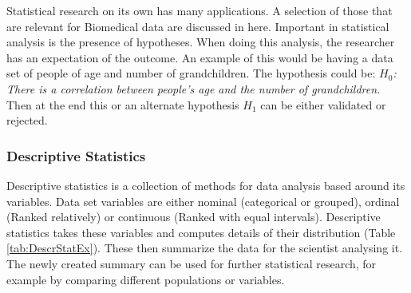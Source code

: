 \documentclass[10pt,a4paper]{article}
\begin{document}
	Statistical research on its own has many applications. A selection of those 
	that are relevant for Biomedical data are discussed in here. Important in 
	statistical analysis is the presence of hypotheses. When doing this 
	analysis, the researcher has an expectation of the outcome. An example of 
	this would be having a data set of people of age and number of 
	grandchildren. The hypothesis could be: \textit{$H_0$: There is a 
	correlation between people's age and the number of grandchildren.} Then at 
	the end this or an alternate hypothesis $H_1$ can be either validated or 
	rejected.\cite{heiberger2004statistical}
	
	\subsubsection{Descriptive Statistics}
	
	Descriptive statistics is a collection of methods for data analysis based around its variables. Data set variables are either nominal (categorical or grouped), ordinal (Ranked relatively) or continuous (Ranked with equal intervals). Descriptive statistics takes these variables and computes details of their distribution (Table \ref{tab:DescrStatEx}). \cite{FISHER200993} These then summarize the data for the scientist analysing it. The newly created summary can be used for further statistical research, for example by comparing different populations or variables. \cite{woolson2011statistical}
	
\end{document}
